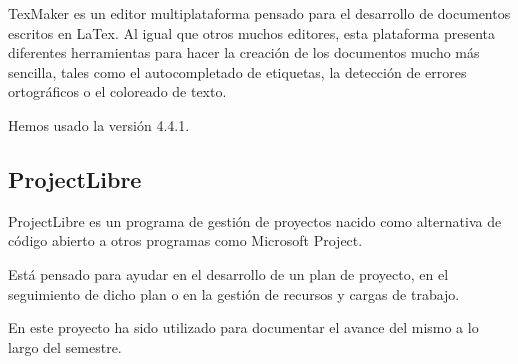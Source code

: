 TexMaker es un editor multiplataforma pensado para el desarrollo de documentos escritos en LaTex. Al igual que otros muchos editores, esta plataforma presenta diferentes herramientas para hacer la creación de los documentos mucho más sencilla, tales como el autocompletado de etiquetas, la detección de errores ortográficos o el coloreado de texto.

Hemos usado la versión 4.4.1.

\subsection{ProjectLibre}
ProjectLibre es un programa de gestión de proyectos nacido como alternativa de código abierto a otros programas como Microsoft Project.

Está pensado para ayudar en el desarrollo de un plan de proyecto, en el seguimiento de dicho plan o en la gestión de recursos y cargas de trabajo.

En este proyecto ha sido utilizado para documentar el avance del mismo a lo largo del semestre. 




